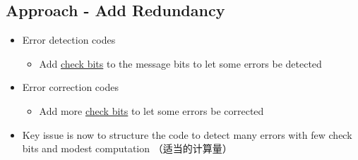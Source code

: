 \documentclass[12pt]{ctexart}   %
\begin{document}
	\subsection{Approach - Add Redundancy}
	\begin{itemize}
		\item Error detection codes
		\begin{itemize}
			\item Add \underline{check bits} to the message bits to let some errors be detected
		\end{itemize}
		
		\item Error correction codes
		\begin{itemize}
			\item Add more \underline{check bits} to let some errors be corrected
		\end{itemize}
		
		\item Key issue is now to structure the code to detect many errors with few check bits and modest computation （适当的计算量）
	\end{itemize}
	
\end{document}
